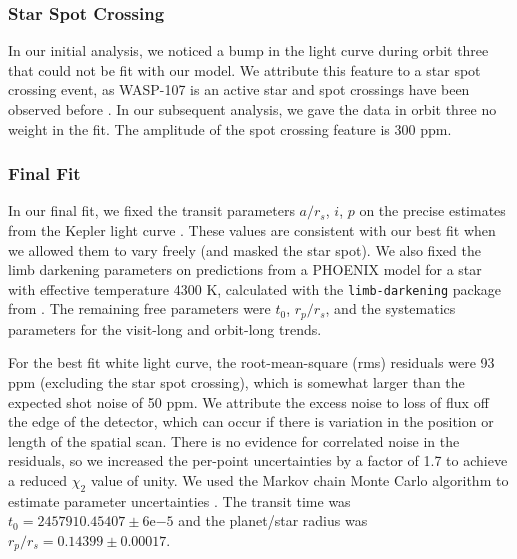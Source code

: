 \documentclass[twocolumn]{aastex61}
\begin{document}
\subsubsection{Star Spot Crossing}
In our initial analysis, we noticed a bump in the light curve during orbit three that could not be fit with our model. We attribute this feature to a star spot crossing event, as WASP-107 is an active star and spot crossings have been observed before \citep{dai17, mocnik17}. In our subsequent analysis, we gave the data in orbit three no weight in the fit. The amplitude of the spot crossing feature is 300 ppm. 


\subsubsection{Final Fit}
In our final fit, we fixed the transit parameters $a/r_s$, $i$, $p$ on the precise estimates from the Kepler light curve \citep{dai17}.  These values are consistent with our best fit when we allowed them to vary freely (and masked the star spot). We also fixed the limb darkening parameters on predictions from a PHOENIX model for a star with effective temperature 4300 K, calculated with the \texttt{limb-darkening} package from \cite{espinoza15}.  The remaining free parameters were $t_0$, $r_p/r_s$, and the systematics parameters for the visit-long and orbit-long trends.

For the best fit white light curve, the root-mean-square (rms) residuals were 93 ppm (excluding the star spot crossing), which is somewhat larger than the expected shot noise of 50 ppm. We attribute the excess noise to loss of flux off the edge of the detector, which can occur if there is variation in the position or length of the spatial scan. There is no evidence for correlated noise in the residuals, so we increased the per-point uncertainties by a factor of 1.7 to achieve a reduced $\chi_2$ value of unity.  We used the Markov chain Monte Carlo algorithm to estimate parameter uncertainties \citep{foremanmackey13}.  The transit time was $t_0 = 2457910.45407\pm6\mathrm{e}{-5}$ and the planet/star radius was $r_p/r_s = 0.14399\pm0.00017$.
\end{document}
